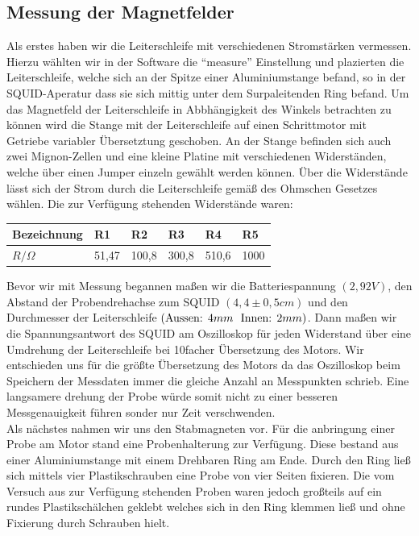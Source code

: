 \documentclass[12pt]{article}
\begin{document}
\subsection{Messung der Magnetfelder}
Als erstes haben wir die Leiterschleife mit verschiedenen Stromstärken vermessen.
Hierzu wählten wir in der Software die "`measure"' Einstellung und plazierten die Leiterschleife, welche sich an der Spitze einer Aluminiumstange befand, so in der SQUID-Aperatur dass sie sich mittig unter dem Surpaleitenden Ring befand. Um das Magnetfeld der Leiterschleife in Abbhängigkeit des Winkels betrachten zu können wird die Stange mit der Leiterschleife auf einen Schrittmotor mit Getriebe variabler Übersetztung geschoben. An der Stange befinden sich auch zwei Mignon-Zellen und eine kleine Platine mit verschiedenen Widerständen, welche über einen Jumper einzeln gewählt werden können. Über die Widerstände lässt sich der Strom durch die Leiterschleife gemäß des Ohmschen Gesetzes wählen. Die zur Verfügung stehenden Widerstände waren:
\begin{center}
\begin{tabular}{|l|lllll|}
\hline 
Bezeichnung & R1 & R2 & R3 & R4 & R5\\
\hline 
$R / \Omega$ & 51,47 & 100,8 & 300,8 & 510,6 & 1000\\
\hline 
\end{tabular}
\end{center}
Bevor wir mit Messung begannen maßen wir die Batteriespannung $(2,92V)$, den Abstand der Probendrehachse zum SQUID $(4,4 \pm 0,5 cm)$ und den Durchmesser der Leiterschleife $(\textnormal{Aussen: }4mm~\textnormal{ Innen: }2mm)$. Dann maßen wir die Spannungsantwort des SQUID am Oszilloskop für jeden Widerstand über eine Umdrehung der Leiterschleife bei 10facher Übersetzung des Motors. Wir entschieden uns für die größte Übersetzung des Motors da das Oszilloskop beim Speichern der Messdaten immer die gleiche Anzahl an Messpunkten schrieb. Eine langsamere drehung der Probe würde somit nicht zu einer besseren Messgenauigkeit führen sonder nur Zeit verschwenden.\\

Als nächstes nahmen wir uns den Stabmagneten vor. Für die anbringung einer Probe am Motor stand eine Probenhalterung zur Verfügung. Diese bestand aus einer Aluminiumstange mit einem Drehbaren Ring am Ende. Durch den Ring ließ sich mittels vier Plastikschrauben eine Probe von vier Seiten fixieren. Die vom Versuch aus zur Verfügung stehenden Proben waren jedoch großteils auf ein rundes Plastikschälchen geklebt welches sich in den Ring klemmen ließ und ohne Fixierung durch Schrauben hielt.
\end{document}
